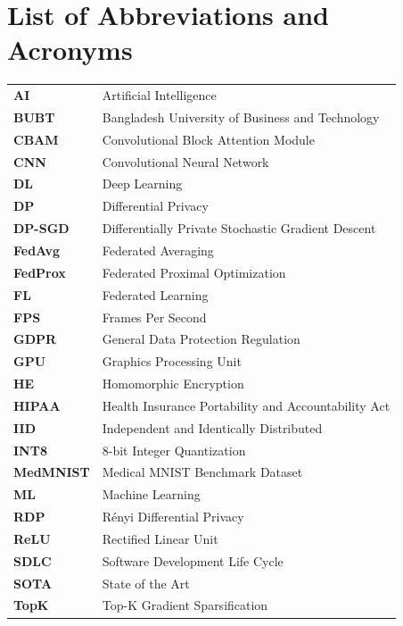 \chapter*{List of Abbreviations and Acronyms}

\vspace{6pt}
\noindent
\begin{tabularx}{\textwidth}{@{}p{2.6cm}X@{}}
\textbf{AI}       & Artificial Intelligence \\
\textbf{BUBT}     & Bangladesh University of Business and Technology \\
\textbf{CBAM}     & Convolutional Block Attention Module \\
\textbf{CNN}      & Convolutional Neural Network \\
\textbf{DL}       & Deep Learning \\
\textbf{DP}       & Differential Privacy \\
\textbf{DP-SGD}   & Differentially Private Stochastic Gradient Descent \\
\textbf{FedAvg}   & Federated Averaging \\
\textbf{FedProx}  & Federated Proximal Optimization \\
\textbf{FL}       & Federated Learning \\
\textbf{FPS}      & Frames Per Second \\
\textbf{GDPR}     & General Data Protection Regulation \\
\textbf{GPU}      & Graphics Processing Unit \\
\textbf{HE}       & Homomorphic Encryption \\
\textbf{HIPAA}    & Health Insurance Portability and Accountability Act \\
\textbf{IID}      & Independent and Identically Distributed \\
\textbf{INT8}     & 8-bit Integer Quantization \\
\textbf{MedMNIST} & Medical MNIST Benchmark Dataset \\
\textbf{ML}       & Machine Learning \\
\textbf{RDP}      & R\'enyi Differential Privacy \\
\textbf{ReLU}     & Rectified Linear Unit \\
\textbf{SDLC}     & Software Development Life Cycle \\
\textbf{SOTA}     & State of the Art \\
\textbf{TopK}     & Top-K Gradient Sparsification \\
\end{tabularx}